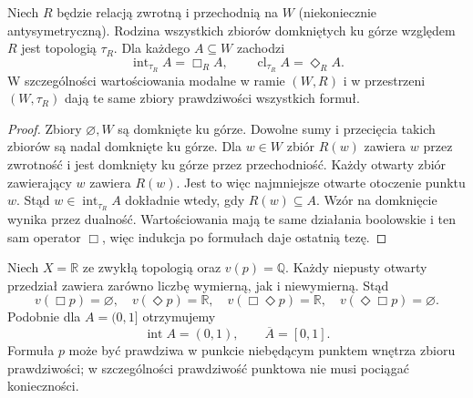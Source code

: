 \begin{stwierdzenie}
\label{prop:ncl-modal-alexandrov}
Niech $R$ będzie relacją zwrotną i przechodnią
na $W$ (niekoniecznie antysymetryczną).
Rodzina wszystkich zbiorów domkniętych ku górze
względem $R$ jest topologią $\tau_R$.
Dla każdego $A\subseteq W$ zachodzi
\[
 \operatorname{int}_{\tau_R} A=\Box_R A,\qquad
 \operatorname{cl}_{\tau_R} A=\Diamond_R A.
\]
W szczególności wartościowania modalne w ramie
$(W,R)$ i w przestrzeni $(W,\tau_R)$ dają
te same zbiory prawdziwości wszystkich formuł.
\end{stwierdzenie}
\begin{proof}
Zbiory $\varnothing,W$ są domknięte ku górze.
Dowolne sumy i przecięcia takich zbiorów
są nadal domknięte ku górze.
Dla $w\in W$ zbiór $R(w)$ zawiera $w$
przez zwrotność i jest domknięty ku górze
przez przechodniość.
Każdy otwarty zbiór zawierający $w$
zawiera $R(w)$. Jest to więc najmniejsze
otwarte otoczenie punktu $w$.
Stąd $w\in\operatorname{int}_{\tau_R} A$
dokładnie wtedy, gdy $R(w)\subseteq A$.
Wzór na domknięcie wynika przez dualność.
Wartościowania mają te same działania
boolowskie i ten sam operator $\Box$,
więc indukcja po formułach daje ostatnią tezę.
\end{proof}

\begin{przyklad}
\label{ex:ncl-modal-real-topology}
Niech $X=\mathbb R$ ze zwykłą topologią
oraz $v(p)=\mathbb Q$.
Każdy niepusty otwarty przedział zawiera
zarówno liczbę wymierną, jak i niewymierną.
Stąd
\[
 v(\Box p)=\varnothing,\quad
 v(\Diamond p)=\mathbb R,\quad
 v(\Box\Diamond p)=\mathbb R,\quad
 v(\Diamond\Box p)=\varnothing.
\]
Podobnie dla $A=(0,1]$ otrzymujemy
\[
 \operatorname{int}A=(0,1),\qquad
 \overline A=[0,1].
\]
Formuła $p$ może być prawdziwa w punkcie
niebędącym punktem wnętrza zbioru prawdziwości;
w szczególności prawdziwość punktowa
nie musi pociągać konieczności.
\end{przyklad}

